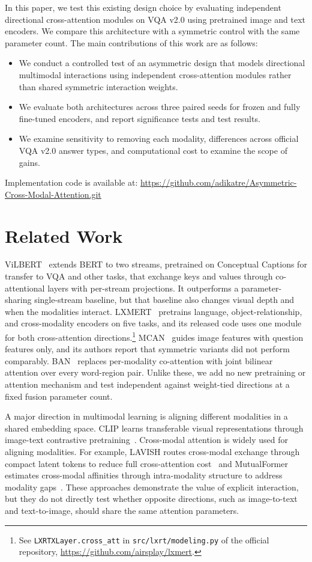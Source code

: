 \documentclass[conference]{IEEEtran}
\begin{document}
In this paper, we test this existing design choice by evaluating independent directional cross-attention modules on VQA v2.0 using pretrained image and text encoders. We compare this architecture with a symmetric control with the same parameter count.
The main contributions of this work are as follows:
\begin{itemize}
\item We conduct a controlled test of an asymmetric design that models directional multimodal interactions using independent cross-attention modules rather than shared symmetric interaction weights.
\item We evaluate both architectures across three paired seeds for frozen and fully fine-tuned encoders, and report significance tests and test results. 
\item We examine sensitivity to removing each modality, differences across official VQA v2.0 answer types, and computational cost to examine the scope of gains.
\end{itemize}

Implementation code is available at: \url{https://github.com/adikatre/Asymmetric-Cross-Modal-Attention.git}

\section{Related Work}
ViLBERT~\cite{lu2019vilbert} extends BERT to two streams, pretrained on Conceptual Captions for transfer to VQA and other tasks, that exchange keys and values through co-attentional layers with per-stream projections. It outperforms a parameter-sharing single-stream baseline, but that baseline also changes visual depth and when the modalities interact. LXMERT~\cite{tan2019lxmert} pretrains language, object-relationship, and cross-modality encoders on five tasks, and its released code uses one module for both cross-attention directions.\footnote{See \texttt{LXRTXLayer.cross\_att} in \texttt{src/lxrt/modeling.py} of the official repository, \url{https://github.com/airsplay/lxmert}.} MCAN~\cite{yu2019deep} guides image features with question features only, and its authors report that symmetric variants did not perform comparably. BAN~\cite{kim2018ban} replaces per-modality co-attention with joint bilinear attention over every word-region pair. Unlike these, we add no new pretraining or attention mechanism and test independent against weight-tied directions at a fixed fusion parameter count.

A major direction in multimodal learning is aligning different modalities in a shared embedding space. CLIP learns transferable visual representations through image-text contrastive pretraining~\cite{radford2021learning}. Cross-modal attention is widely used for aligning modalities. For example, LAVISH routes cross-modal exchange through compact latent tokens to reduce full cross-attention cost~\cite{lin2023lavish} and MutualFormer estimates cross-modal affinities through intra-modality structure to address modality gaps~\cite{hu2024mutualformer}. These approaches demonstrate the value of explicit interaction, but they do not directly test whether opposite directions, such as image-to-text and text-to-image, should share the same attention parameters.
\end{document}
